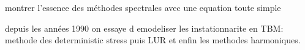 
montrer l'essence des méthodes spectrales avec une equation toute simple

depuis les années 1990 on essaye d emodeliser les instationnarite en TBM:
methode des deterministic stress puis LUR et enfin les methodes harmoniques.


